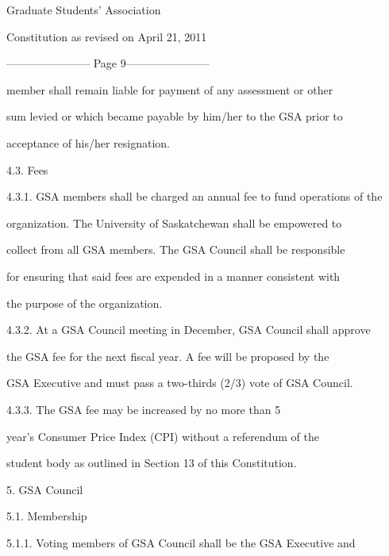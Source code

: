                                Graduate Students’ Association  



                          Constitution as revised on April 21, 2011  


----------------------- Page 9-----------------------

        member  shall  remain  liable  for  payment  of  any  assessment  or  other  

        sum levied or which became payable by him/her to the GSA prior to  

        acceptance of his/her resignation.  



4.3.        Fees  



4.3.1. GSA members shall be charged an annual fee to fund operations of the  

        organization. The University of Saskatchewan shall be empowered to  

        collect from all GSA members. The GSA Council shall be responsible  

        for ensuring that said fees  are  expended in  a  manner  consistent with  

        the purpose of the organization.  



4.3.2. At a GSA Council meeting in December, GSA Council shall approve  

        the  GSA  fee  for  the  next  fiscal  year.  A  fee  will  be  proposed  by  the  

        GSA Executive and must pass a two-thirds (2/3) vote of GSA Council.  



4.3.3. The GSA fee may be increased by no more than 5%

        year’s  Consumer  Price  Index  (CPI)  without  a  referendum  of  the  

        student body as outlined in Section 13 of this Constitution.  



  



5.  GSA Council  



5.1.        Membership  



5.1.1. Voting  members  of    GSA  Council  shall  be  the  GSA  Executive  and  

